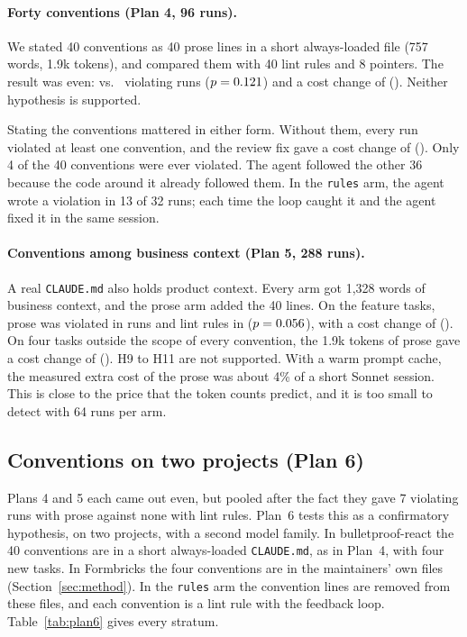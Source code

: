 \documentclass[pdflatex,sn-mathphys-num]{sn-jnl}
\newcommand{\file}[1]{\texttt{#1}}
\newcommand{\arm}[1]{\texttt{#1}}
\begin{document}
\paragraph{Forty conventions (Plan 4, 96 runs).}
We stated 40 conventions as 40 prose lines in a short always-loaded file (757 words, 1.9k tokens), and compared them with 40 lint rules and 8 pointers.
The result was even: \HSevenBreaks{} vs.\ \HSevenBreaksAgainst{} violating runs ($p=0.121$) and a cost change of \HEightCost{} (\HEightCI).
Neither hypothesis is supported.

Stating the conventions mattered in either form.
Without them, every run violated at least one convention, and the review fix gave a cost change of \NoneVsProseCost{} (\NoneVsProseCI).
Only 4 of the 40 conventions were ever violated.
The agent followed the other 36 because the code around it already followed them.
In the \arm{rules} arm, the agent wrote a violation in 13 of 32 runs; each time the loop caught it and the agent fixed it in the same session.

\paragraph{Conventions among business context (Plan 5, 288 runs).}
A real \file{CLAUDE.md} also holds product context.
Every arm got 1,328 words of business context, and the prose arm added the 40 lines.
On the feature tasks, prose was violated in \HNineBreaks{} runs and lint rules in \HNineBreaksAgainst{} ($p=0.056$), with a cost change of \HTenCost{} (\HTenCI).
On four tasks outside the scope of every convention, the 1.9k tokens of prose gave a cost change of \HElevenCost{} (\HElevenCI).
H9 to H11 are not supported.
With a warm prompt cache, the measured extra cost of the prose was about 4\% of a short Sonnet session.
This is close to the price that the token counts predict, and it is too small to detect with 64 runs per arm.

\subsection{Conventions on two projects (Plan 6)}
\label{sec:plan6}

Plans 4 and 5 each came out even, but pooled after the fact they gave 7 violating runs with prose against none with lint rules.
Plan~6 tests this as a confirmatory hypothesis, on two projects, with a second model family.
In bulletproof-react the 40 conventions are in a short always-loaded \file{CLAUDE.md}, as in Plan~4, with four new tasks.
In Formbricks the four conventions are in the maintainers' own files (Section~\ref{sec:method}).
In the \arm{rules} arm the convention lines are removed from these files, and each convention is a lint rule with the feedback loop.
Table~\ref{tab:plan6} gives every stratum.
\end{document}
